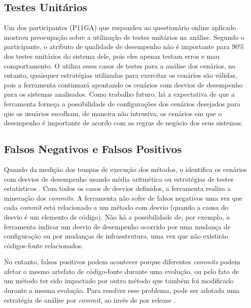 \subsection{Testes Unitários} \label{subsec:avaliacao-consideracoes-testes-unitarios}

Um dos participantes (P11GA) que respondeu ao questionário online aplicado mostrou preocupação sobre a utilização de testes unitários na análise. Segundo o participante, o atributo de qualidade de desempenho não é importante para 90\% dos testes unitários do sistema dele, pois eles apenas testam erros e mau comportamento. O \textit{\perfMinerName} utiliza esses casos de testes para a análise dos cenários, no entanto, quaisquer estratégias utilizadas para exercitar os cenários são válidas, pois a ferramenta continuará apontando os cenários com desvios de desempenho para os sistemas analisados. Como trabalho futuro, há a expectativa de que a ferramenta forneça a possibilidade de configurações dos cenários desejados para que os usuários escolham, de maneira não intrusiva, os cenários em que o desempenho é importante de acordo com as regras de negócio dos seus sistemas.

\subsection{Falsos Negativos e Falsos Positivos}

Quando da medição dos tempos de execução dos métodos, o \textit{\perfMinerName} identifica os cenários com desvios de desempenho usando média aritmética ou estratégias de testes estatísticos \cite{Pinto2015}. Com todos os casos de desvios definidos, a ferramenta realiza a mineração dos \textit{commits}. A ferramenta não sofre de falsos negativos uma vez que cada \textit{commit} está relacionado a um método com desvio (quando a causa do desvio é um elemento de código). Não há a possibilidade de, por exemplo, a ferramenta indicar um desvio de desempenho ocorrido por uma mudança de configuração ou por mudanças de infraestrutura, uma vez que não existirão códigos-fonte relacionados.

No entanto, falsos positivos podem acontecer porque diferentes \textit{commits} podem afetar o mesmo artefato de código-fonte durante uma evolução, ou pelo fato de um método ter sido impactado por outro método que também foi modificado durante a mesma evolução. Para resolver esse problema, pode ser adotada uma estratégia de análise por \textit{commit}, ao invés de por release \cite{Pinto2015}.

